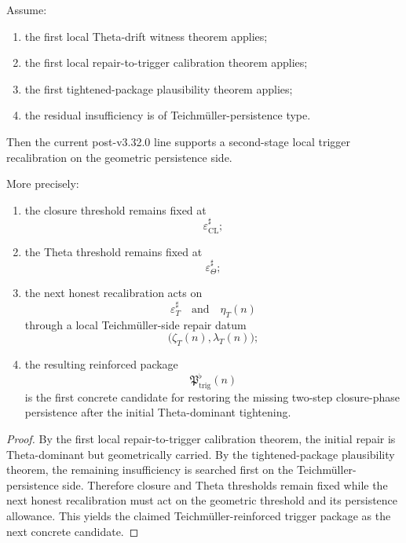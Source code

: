 \begin{theorem}\label{thm:first-local-teichmueller-persistence-repair-theorem}
Assume:
\begin{enumerate}
    \item the first local Theta-drift witness theorem applies;
    \item the first local repair-to-trigger calibration theorem applies;
    \item the first tightened-package plausibility theorem applies;
    \item the residual insufficiency is of Teichm\"uller-persistence type.
\end{enumerate}
Then the current post-v3.32.0 line supports a second-stage local trigger recalibration on the geometric persistence side.

More precisely:
\begin{enumerate}
    \item the closure threshold remains fixed at
    \[
    \varepsilon_{\mathrm{CL}}^{\sharp};
    \]
    \item the Theta threshold remains fixed at
    \[
    \varepsilon_{\Theta}^{\sharp};
    \]
    \item the next honest recalibration acts on
    \[
    \varepsilon_T^{\sharp}
    \quad\text{and}\quad
    \eta_T(n)
    \]
    through a local Teichm\"uller-side repair datum
    \[
    \bigl(\zeta_T(n),\lambda_T(n)\bigr);
    \]
    \item the resulting reinforced package
    \[
    \mathfrak{P}_{\mathrm{trig}}^{\flat}(n)
    \]
    is the first concrete candidate for restoring the missing two-step closure-phase persistence after the initial Theta-dominant tightening.
\end{enumerate}
\end{theorem}

\begin{proof}
By the first local repair-to-trigger calibration theorem, the initial repair is Theta-dominant but geometrically carried. By the tightened-package plausibility theorem, the remaining insufficiency is searched first on the Teichm\"uller-persistence side. Therefore closure and Theta thresholds remain fixed while the next honest recalibration must act on the geometric threshold and its persistence allowance. This yields the claimed Teichm\"uller-reinforced trigger package as the next concrete candidate.
\end{proof}


